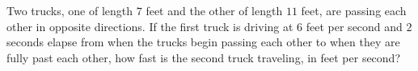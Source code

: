 Two trucks, one of length $7$ feet and the other of length $11$ feet, are passing each other in opposite directions. If the first truck is driving at $6$ feet per second and $2$ seconds elapse from when the trucks begin passing each other to when they are fully past each other, how fast is the second truck traveling, in feet per second?
